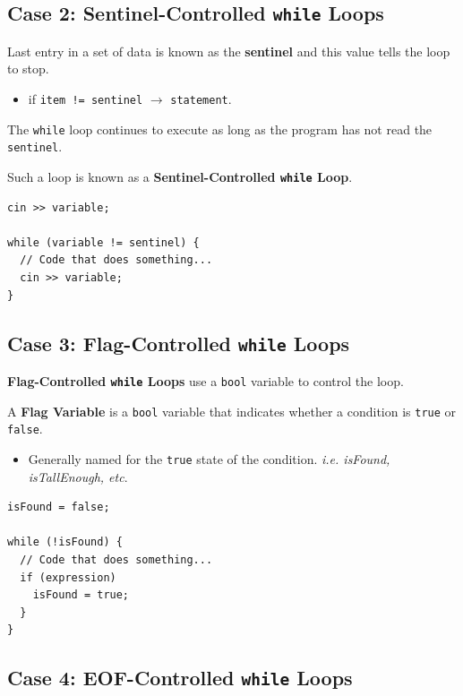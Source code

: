 \documentclass{article}
\begin{document}
\subsection{Case 2: Sentinel-Controlled \texttt{while} Loops}

Last entry in a set of data is known as the \textbf{sentinel} and this value
tells the loop to stop.

\begin{itemize}
  \item if \texttt{item != sentinel} $\rightarrow$ \texttt{statement}.
\end{itemize}

The \texttt{while} loop continues to execute as long as the program has not read
the \texttt{sentinel}.

\vspace{8pt}
Such a loop is known as a \textbf{Sentinel-Controlled \texttt{while} Loop}.

\begin{lstlisting}[caption={Sentinel-Controlled \texttt{while} Loop
  Syntax}]
cin >> variable;

while (variable != sentinel) {
  // Code that does something...
  cin >> variable;
}
\end{lstlisting}

\subsection{Case 3: Flag-Controlled \texttt{while} Loops}

\textbf{Flag-Controlled \texttt{while} Loops} use a \texttt{bool} variable to
control the loop.

\vspace{8pt}
A \textbf{Flag Variable} is a \texttt{bool} variable that indicates whether a
condition is \texttt{true} or \texttt{false}.
\begin{itemize}
  \item Generally named for the \texttt{true} state of the condition. \textit{i.e. isFound, isTallEnough, etc}.
\end{itemize}

\begin{lstlisting}[caption={Flag-Controlled \texttt{while} Loop
  Example}]
isFound = false;

while (!isFound) {
  // Code that does something...
  if (expression)
    isFound = true;
  }
}
\end{lstlisting}

\subsection{Case 4: EOF-Controlled \texttt{while} Loops}
\end{document}
